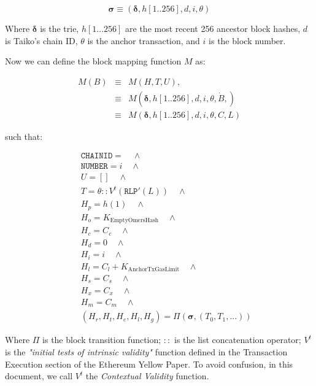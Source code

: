 \documentclass[9pt,oneside]{amsart}
\begin{document}
\begin{multicols}{2}
$$\boldsymbol{\sigma} \equiv (\boldsymbol{\delta}, h[1..256], d, i, \theta)$$

Where $\boldsymbol{\delta}$ is the trie, $h[1...256]$ are the most recent 256 ancestor block hashes, $d$ is Taiko's chain ID, $\theta$ is the anchor transaction, and $i$ is the block number.

Now we can define the block mapping function $M$ as:

\begin{eqnarray}
M(B) & \equiv & M(H, T, U), \\
\nonumber & \equiv &  M(\boldsymbol{\delta}, h[1..256], {d}, i, \theta, \dot{B}, )  \\
\nonumber & \equiv & M(\boldsymbol{\delta}, h[1..256], {d}, i, \theta, C, L)
\end{eqnarray}


such that:

\begin{eqnarray}
& & \texttt{CHAINID}  = \quad \wedge \\
\nonumber& & \texttt{NUMBER} = {i} \quad \wedge \\
\nonumber& & U = [] \quad \wedge \\
\nonumber& & T =  \theta::V^t(\texttt{RLP}'(L)) \quad \wedge  \\
\nonumber& & H_p =  h(1) \quad \wedge \\
\nonumber& & H_o =   K_{\mathrm{EmptyOmersHash}} \quad \wedge \\
\nonumber& & H_c =   C_c \quad \wedge \\
\nonumber& & H_d =   0 \quad \wedge \\
\nonumber& & H_i =   i \quad \wedge \\
\nonumber& & H_l =   C_l + K_{\mathrm{AnchorTxGasLimit}} \quad \wedge \\
\nonumber& & H_s =   C_s \quad \wedge \\
\nonumber& & H_x =   C_x \quad \wedge \\
\nonumber& & H_m =   C_m \quad \wedge \\
\nonumber& & (H_r, H_t, H_e, H_l, H_g) =   \Pi(\boldsymbol{\sigma}, (T_0, T_1, ...))
\end{eqnarray}

Where $\Pi$ is the block transition function; $::$ is the list concatenation operator; $V^t$ is the \textit{"initial tests of intrinsic validity"} function defined in the Transaction Execution section of the Ethereum Yellow Paper. To avoid confusion, in this document, we call $V^t$ the \textit{Contextual Validity } function.


\end{multicols}
\end{document}
